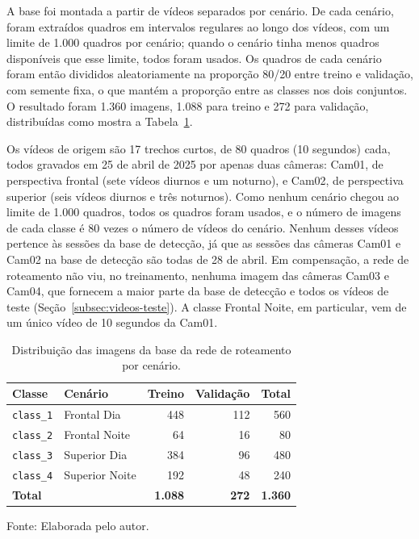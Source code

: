 A base foi montada a partir de vídeos separados por cenário. De cada cenário, foram extraídos quadros em intervalos regulares ao longo dos vídeos, com um limite de 1.000 quadros por cenário; quando o cenário tinha menos quadros disponíveis que esse limite, todos foram usados. Os quadros de cada cenário foram então divididos aleatoriamente na proporção 80/20 entre treino e validação, com semente fixa, o que mantém a proporção entre as classes nos dois conjuntos. O resultado foram 1.360 imagens, 1.088 para treino e 272 para validação, distribuídas como mostra a Tabela~\ref{tab:dataset-roteamento}.

Os vídeos de origem são 17 trechos curtos, de 80 quadros (10 segundos) cada, todos gravados em 25 de abril de 2025 por apenas duas câmeras: Cam01, de perspectiva frontal (sete vídeos diurnos e um noturno), e Cam02, de perspectiva superior (seis vídeos diurnos e três noturnos). Como nenhum cenário chegou ao limite de 1.000 quadros, todos os quadros foram usados, e o número de imagens de cada classe é 80 vezes o número de vídeos do cenário. Nenhum desses vídeos pertence às sessões da base de detecção, já que as sessões das câmeras Cam01 e Cam02 na base de detecção são todas de 28 de abril. Em compensação, a rede de roteamento não viu, no treinamento, nenhuma imagem das câmeras Cam03 e Cam04, que fornecem a maior parte da base de detecção e todos os vídeos de teste (Seção~\ref{subsec:videos-teste}). A classe Frontal Noite, em particular, vem de um único vídeo de 10 segundos da Cam01.

\begin{table}[htb]
\centering
\caption{Distribuição das imagens da base da rede de roteamento por cenário.}
\label{tab:dataset-roteamento}
\begin{tabular}{llrrr}
\hline
\textbf{Classe} & \textbf{Cenário} & \textbf{Treino} & \textbf{Validação} & \textbf{Total} \\
\hline
\texttt{class\_1} & Frontal Dia & 448 & 112 & 560 \\
\texttt{class\_2} & Frontal Noite & 64 & 16 & 80 \\
\texttt{class\_3} & Superior Dia & 384 & 96 & 480 \\
\texttt{class\_4} & Superior Noite & 192 & 48 & 240 \\
\hline
\textbf{Total} & & \textbf{1.088} & \textbf{272} & \textbf{1.360} \\
\hline
\end{tabular}

\vspace{0.2cm}
Fonte: Elaborada pelo autor.
\end{table}

